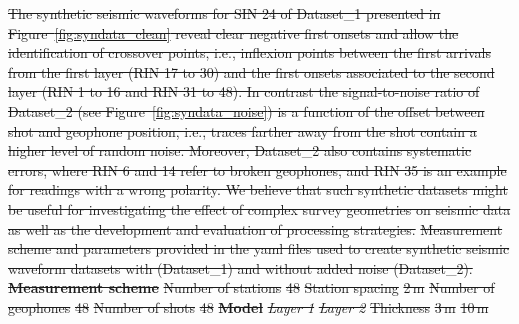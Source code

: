\documentclass[a4paper,fleqn]{cas-sc}
\providecommand{\DIFdel}[1]{{\protect\color{red}\sout{#1}}}                      %
\providecommand{\DIFdelFL}[1]{\DIFdel{#1}} %
\begin{document}
\DIFdel{The synthetic seismic waveforms for SIN 24 of Dataset\_1 presented in Figure~\ref{fig:syndata_clean} reveal clear negative first onsets and allow the identification of crossover points, i.e., inflexion points between the first arrivals from the first layer (RIN 17 to 30) and the first onsets associated to the second layer (RIN 1 to 16 and RIN 31 to 48).
In contrast the signal-to-noise ratio of Dataset\_2 (see Figure~\ref{fig:syndata_noise}) is a function of the offset between shot and geophone position, i.e., traces farther away from the shot contain a higher level of random noise. 
Moreover, Dataset\_2 also contains systematic errors, where RIN 6 and 14 refer to broken geophones, and RIN 35 is an example for readings with a wrong polarity.
We believe that such synthetic datasets might be useful for investigating the effect of complex survey geometries on seismic data as well as the development and evaluation of processing strategies.
}%
{%
\DIFdelFL{Measurement scheme and parameters provided in the yaml files used to create synthetic seismic waveform datasets with (Dataset\_1) and without added noise (Dataset\_2).}}
\textbf{\DIFdelFL{Measurement scheme}} %
\DIFdelFL{Number of stations }%
\DIFdelFL{48 }%
\DIFdelFL{Station spacing }%
\DIFdelFL{2\,m }%
\DIFdelFL{Number of geophones }%
\DIFdelFL{48 }%
\DIFdelFL{Number of shots }%
\DIFdelFL{48 }%
\textbf{\DIFdelFL{Model}} %
\textit{\DIFdelFL{Layer 1}} %
\textit{\DIFdelFL{Layer 2}} %
\DIFdelFL{Thickness }%
\DIFdelFL{3\,m }%
\DIFdelFL{10\,m }%
\end{document}
